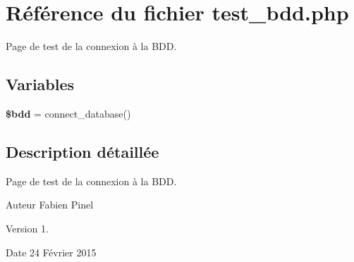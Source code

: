 \hypertarget{test__bdd_8php}{\section{Référence du fichier test\-\_\-bdd.\-php}
\label{test__bdd_8php}
}


Page de test de la connexion à la B\-D\-D.  


\subsection*{Variables}
\begin{DoxyCompactItemize}
\item 
\hypertarget{test__bdd_8php_a94f91e878bce0991e2cd595c5dd79b3f}{{\bfseries \$bdd} = connect\-\_\-database()}\label{test__bdd_8php_a94f91e878bce0991e2cd595c5dd79b3f}

\end{DoxyCompactItemize}


\subsection{Description détaillée}
Page de test de la connexion à la B\-D\-D. \begin{DoxyAuthor}{Auteur}
Fabien Pinel 
\end{DoxyAuthor}
\begin{DoxyVersion}{Version}
1. 
\end{DoxyVersion}
\begin{DoxyDate}{Date}
24 Février 2015 
\end{DoxyDate}
